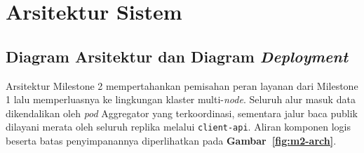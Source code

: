 \section{Arsitektur Sistem}

\subsection{Diagram Arsitektur dan Diagram \textit{Deployment}}

Arsitektur Milestone 2 mempertahankan pemisahan peran layanan dari Milestone 1 lalu memperluasnya ke lingkungan klaster multi-\textit{node}. Seluruh alur masuk data dikendalikan oleh \textit{pod} Aggregator yang terkoordinasi, sementara jalur baca publik dilayani merata oleh seluruh replika melalui \texttt{client-api}. Aliran komponen logis beserta batas penyimpanannya diperlihatkan pada \textbf{Gambar~\ref{fig:m2-arch}}.

